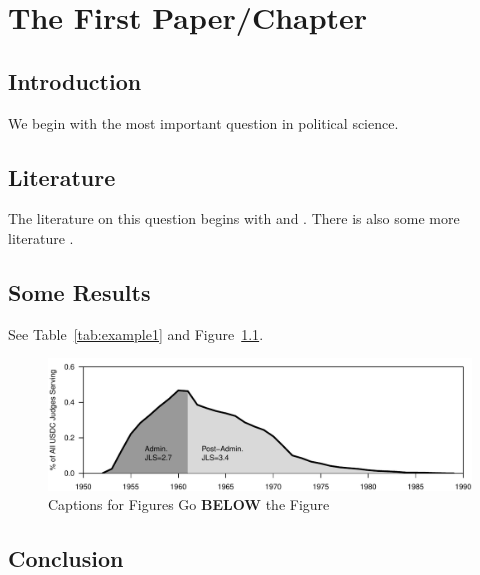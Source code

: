 \chapter{The First Paper/Chapter}

\section{Introduction}

We begin with the most important question in political science. \lipsum[1]

\section{Literature}

The literature on this question begins with  \citet{tocqueville1838} and \citet{wilson1885}. There is also some more literature \citep{downs1957,baron1989,cox1993,krehbiel1998}. \lipsum[2]

\section{Some Results}

See Table~\ref{tab:example1} and Figure~\ref{fig:example2}. \lipsum[3] 



\lipsum[4]

\begin{figure}[htbp]
   \centering
   \includegraphics[width=\textwidth]{figures/example_figure.pdf}
   
\caption{Captions for Figures Go \textbf{BELOW} the Figure}
\label{fig:example2} %
\end{figure}

\lipsum[5]

\section{Conclusion}
\lipsum[6-7] 